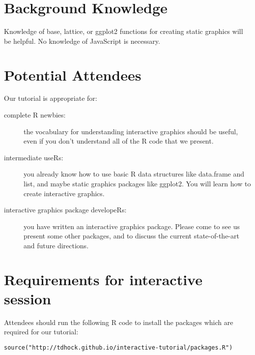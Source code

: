 \documentclass[11pt]{article}
\begin{document}
\section*{Background Knowledge}

Knowledge of base, lattice, or ggplot2
functions for creating static graphics will be helpful. No
knowledge of JavaScript is necessary.

\section*{Potential Attendees}
\label{sec:orgheadline12}
Our tutorial is appropriate for:
\begin{description}
\item[complete R newbies:] the vocabulary for understanding interactive
graphics should be useful, even if you don't understand all of the R
code that we present.
\item[intermediate useRs:] you already know how to use basic R data
  structures like data.frame and list, and maybe static graphics
  packages like ggplot2. You will learn how to create interactive
  graphics.
\item[interactive graphics package developeRs:] you have written an
  interactive graphics package. Please come to see us present some
  other packages, and to discuss the current state-of-the-art and
  future directions.
\end{description}

\section*{Requirements for interactive session}

Attendees should run the following R code to install the packages
which are required for our tutorial:

\begin{verbatim}
source("http://tdhock.github.io/interactive-tutorial/packages.R")
\end{verbatim}
\end{document}
